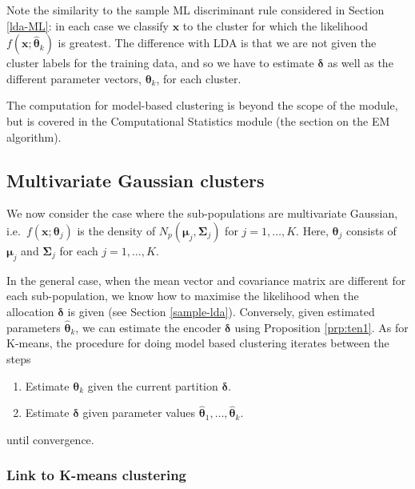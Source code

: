 \documentclass[
]{book}
\theoremstyle{definition}
\theoremstyle{definition}
\theoremstyle{definition}
\theoremstyle{definition}
\theoremstyle{remark}
\begin{document}
Note the similarity to the sample ML discriminant rule considered in Section \ref{lda-ML}: in each case we classify \(\mathbf x\) to the cluster for which the likelihood \(f(\mathbf x; \hat{\boldsymbol \theta}_k)\) is greatest. The difference with LDA is that we are not given the cluster labels for the training data, and so we have to estimate \(\boldsymbol \delta\) as well as the different parameter vectors, \(\boldsymbol \theta_k\), for each cluster.

The computation for model-based clustering is beyond the scope of the module, but is covered in the Computational Statistics module (the section on the EM algorithm).

\subsection{Multivariate Gaussian clusters}\label{multivariate-gaussian-clusters}

We now consider the case where the sub-populations are multivariate Gaussian, i.e.~\(f(\mathbf x; \boldsymbol \theta_j)\) is the density of \(N_p({\boldsymbol{\mu}}_j, \boldsymbol{\Sigma}_j)\) for \(j=1, \ldots , K\). Here, \(\boldsymbol \theta_j\) consists of \({\boldsymbol{\mu}}_j\) and \(\boldsymbol{\Sigma}_j\) for each \(j=1, \ldots , K\).

In the general case, when the mean vector and covariance matrix are different for each sub-population, we know how to maximise the likelihood when the allocation \(\boldsymbol \delta\) is given (see Section \ref{sample-lda}). Conversely, given estimated parameters \(\hat{\boldsymbol \theta}_k\), we can estimate the encoder \(\boldsymbol \delta\) using Proposition \ref{prp:ten1}. As for K-means, the procedure for doing model based clustering iterates between the steps

\begin{enumerate}
\def\labelenumi{\arabic{enumi}.}
\item
  Estimate \(\boldsymbol \theta_k\) given the current partition \(\boldsymbol \delta\).
\item
  Estimate \(\boldsymbol \delta\) given parameter values \(\hat{\boldsymbol \theta}_1, \ldots, \hat{\boldsymbol \theta}_k\).
\end{enumerate}

until convergence.

\subsubsection{Link to K-means clustering}\label{link-to-k-means-clustering}
\end{document}
